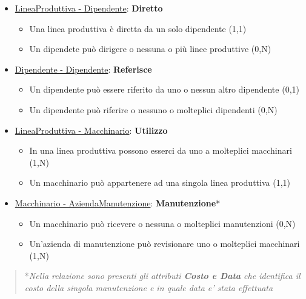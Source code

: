 \begin{itemize}
	\item \underline{LineaProduttiva - Dipendente}: \textbf{Diretto}
	
	\begin{itemize}
		\item Una linea produttiva è diretta da un solo dipendente (1,1)
		\item Un dipendete può dirigere o nessuna o più linee produttive (0,N)
	\end{itemize}
	
\end{itemize}

\begin{itemize}
	\item \underline{Dipendente - Dipendente}: \textbf{Referisce}
	
	\begin{itemize}
		\item Un dipendente può essere riferito da uno o nessun altro dipendente (0,1)
		\item Un dipendente può riferire o nessuno o molteplici dipendenti (0,N)
	\end{itemize}
	
\end{itemize}

\begin{itemize}
	\item \underline{LineaProduttiva - Macchinario}: \textbf{Utilizzo}
	
	\begin{itemize}
		\item In una linea produttiva possono esserci da uno a molteplici macchinari (1,N)
		\item Un macchinario può appartenere ad una singola linea produttiva (1,1)
	\end{itemize}
	
\end{itemize}

\begin{itemize}
	\item \underline{Macchinario - AziendaManutenzione}: \textbf{Manutenzione}*
	
	\begin{itemize}
		\item Un macchinario può ricevere o nessuna o molteplici manutenzioni (0,N)
		\item Un'azienda di manutenzione può revisionare uno o molteplici macchinari (1,N)
	\end{itemize}
	
\end{itemize}

\begin{verse}
	*\emph{Nella relazione sono presenti gli attributi \textbf{Costo e Data} che identifica il costo della singola manutenzione e in quale data e' stata effettuata}
\end{verse}

